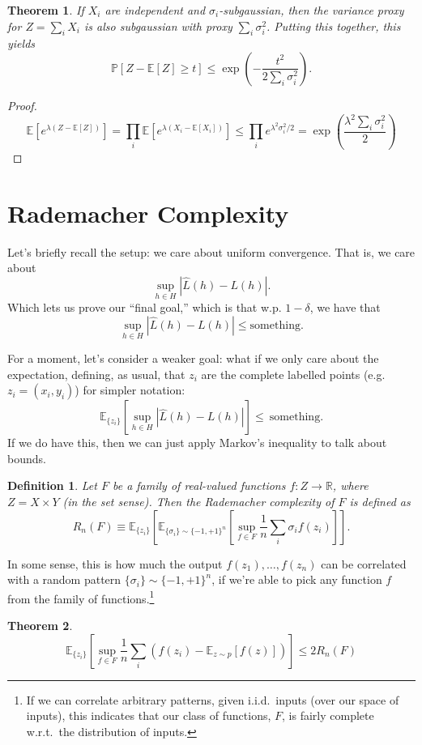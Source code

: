 \documentclass[11pt]{article}
\newcommand{\ex}[1]{\mathbb{E}\left[{#1}\right]}
\newcommand{\exu}[2]{\mathbb{E}_{#1}\left[{#2}\right]}
\newcommand{\pp}[1]{\mathbb{P}\left[{#1}\right]}
\newcommand{\reals}{\mathbb{R}}
\newtheorem{definition}{Definition}
\newtheorem{theorem}{Theorem}
\begin{document}
\begin{theorem}
  If $X_i$ are independent and $\sigma_i$-subgaussian, then the variance proxy for $Z = \sum_i X_i$ is also subgaussian with proxy $\sum_i \sigma_i^2$. Putting this together, this yields
  \[
    \pp{Z - \ex{Z} \ge t}\le \exp\left(-\frac{t^2}{2\sum_i \sigma_i^2}\right).
  \]
\end{theorem}

\begin{proof}
  \[
    \ex{e^{\lambda(Z - \ex Z)}} = \prod_i \ex{e^{\lambda(X_i - \ex {X_i})}} \le \prod_i e^{\lambda^2 \sigma_i^2/2} = \exp\left(\frac{\lambda^2 \sum_i \sigma_i^2}{2}\right)
  \]
\end{proof}

\section{Rademacher Complexity}
Let's briefly recall the setup: we care about uniform convergence. That is, we care about
\[
  \sup_{h \in H} |\hat L (h) - L(h)|.
\]
Which lets us prove our ``final goal,'' which is that w.p. $1 - \delta$, we have that
\[
  \sup_{h \in H} |\hat L (h) - L(h)| \le \mathrm{something}.
\]

For a moment, let's consider a weaker goal: what if we only care about the expectation, defining, as usual, that $z_i$ are the complete labelled points (e.g. $z_i = (x_i, y_i)$) for simpler notation:
\[
  \exu{\{z_i\}}{\sup_{h \in H} |\hat L (h) - L(h)|} \le ~\mathrm{something}.
\]
If we do have this, then we can just apply Markov's inequality to talk about bounds.

\begin{definition}
  Let $F$ be a family of real-valued functions $f:Z \to \reals$, where $Z = X \times Y$ (in the set sense). Then the Rademacher complexity of $F$ is defined as
  \[
    R_n(F) \equiv \exu{\{z_i\}}{\exu{\{\sigma_i\} \sim \{-1, +1\}^n}{\sup_{f \in F} \frac{1}{n}\sum_i \sigma_i f(z_i)}}.
  \]
\end{definition}

In some sense, this is how much the output $f(z_1), \dots, f(z_n)$ can be correlated with a random pattern $\{\sigma_i\}\sim \{-1, +1\}^n$, if we're able to pick any function $f$ from the family of functions.\footnote{If we can correlate arbitrary patterns, given i.i.d.\ inputs (over our space of inputs), this indicates that our class of functions, $F$, is fairly complete w.r.t.\ the distribution of inputs.}

\begin{theorem}\label{theorem2}
  \[
    \exu{\{z_i\}}{\sup_{f \in F} \frac{1}{n}\sum_i\left( f(z_i) - \exu{z \sim p}{f(z)}\right)} \le 2R_n(F)
  \]
\end{theorem}
\end{document}
